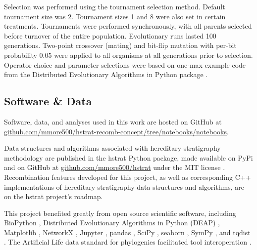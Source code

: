 Selection was performed using the tournament selection method.
Default tournament size was 2.
Tournament sizes 1 and 8 were also set in certain treatments.
Tournaments were performed synchronously, with all parents selected before turnover of the entire population.
Evolutionary runs lasted 100 generations.
Two-point crossover (mating) and bit-flip mutation with per-bit probability 0.05 were applied to all organisms at all generations prior to selection.
Operator choice and parameter selections were based on one-max example code from the Distributed Evolutionary Algorithms in Python package \citep{fortin2012deap}.







\subsection{Software \& Data}
\label{sec:software-data}

Software, data, and analyses used in this work are hosted on GitHub at \url{github.com/mmore500/hstrat-recomb-concept/tree/notebooks/notebooks}.

Data structures and algorithms associated with hereditary stratigraphy methodology are published in the hstrat Python package, made available on PyPi and on GitHub at \url{github.com/mmore500/hstrat} under the MIT license \citep{moreno2022hstrat}.
Recombination features developed for this project, as well as corresponding C++ implementations of hereditary stratigraphy data structures and algorithms, are on the hstrat project's roadmap.

This project benefited greatly from open source scientific software, including BioPython \citep{cock2009biopython}, Distributed Evolutionary Algorithms in Python (DEAP) \citep{fortin2012deap}, Matplotlib \citep{hunter2007matplotlib}, NetworkX \citep{hagberg2008networkx}, Jupyter \citep{loizides2016jupyter}, pandas \citep{mckinney2010pandas}, SciPy \citep{pauli2020scipy}, seaborn \citep{waskom2021seaborn}, SymPy \citep{meurer2017sympy}, and tqdist \citep{sand2014tqdist}.
The Artificial Life data standard for phylogenies facilitated tool interoperation \citep{lalejini2019data}.
